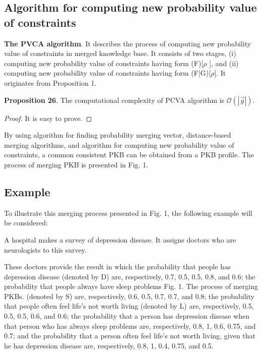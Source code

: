 \documentclass[]{iosart2c}
\begin{document}
  \subsection{Algorithm for computing new probability value of constraints}

  \textbf{The PVCA algorithm}. It describes the process of computing new probability value of constraints in merged knowledge base. It consists of two stages, (i) computing new probability value of constraints having form (F)[$\rho$ ], and (ii) computing new probability value of constraints having form (F|G)[$\rho$]. It originates from Proposition 1.

  \textbf{Proposition 26}. The computational complexity of PCVA algorithm is $\mathcal{O}(|\vec{y} |)$.

  \begin{proof}
    It is easy to prove.
  \end{proof}


  By using algorithm for finding probability merging vector, distance-based merging algorithms, and algorithm for computing new probability value of constraints, a common consistent PKB can be obtained from a PKB profile. The process of merging PKB is presented in Fig. 1.

  \subsection{Example}

  To illustrate this merging process presented in Fig. 1, the following example will be considered:

  A hospital makes a survey of depression disease. It assigns doctors who are neurologists to this survey.

  These doctors provide the result in which the probability that people has depression disease (denoted by D) are, respectively, 0.7, 0.5, 0.5, 0.8, and 0.6; the probability that people always have sleep problems Fig. 1. The process of merging PKBs.
  (denoted by S) are, respectively, 0.6, 0.5, 0.7, 0.7, and 0.8; the probability that people often feel life’s not worth living (denoted by L) are, respectively, 0.5, 0.5, 0.5, 0.6, and 0.6; the probability that a person has depression disease when that person who has always sleep problems are, respectively, 0.8, 1, 0.6, 0.75, and 0.7; and the probability that a person often feel life’s not worth living, given that he has depression disease are, respectively, 0.8, 1, 0.4, 0.75, and 0.5.
\end{document}
